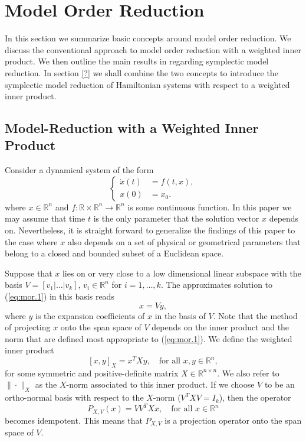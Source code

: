 \section{Model Order Reduction}
\label{sec:mor}

In this section we summarize basic concepts around model order reduction. We discuss the conventional approach to model order reduction with a weighted inner product. We then outline the main results in \cite{doi:10.1137/17M1111991} regarding symplectic model reduction. In section \ref{?} we shall combine the two concepts to introduce the symplectic model reduction of Hamiltonian systems with respect to a weighted inner product.

\subsection{Model-Reduction with a Weighted Inner Product} \label{sec:mor.1}
Consider a dynamical system of the form
\begin{equation} \label{eq:mor.1}
\left\{
\begin{aligned}
	\dot x(t) &= f(t,x), \\
	x(0) &= x_0.
\end{aligned}
\right.
\end{equation}
where $x\in \mathbb R^{n}$ and $f:\mathbb R \times \mathbb R^{n} \to \mathbb R^{n}$ is some continuous function. In this paper we may assume that time $t$ is the only parameter that the solution vector $x$ depends on. Nevertheless, it is straight forward to generalize the findings of this paper to the case where $x$ also depends on a set of physical or geometrical parameters that belong to a closed and bounded subset of a Euclidean space.

Suppose that $x$ lies on or very close to a low dimensional linear subspace with the basis $V=[v_1|\dots|v_k]$, $v_i\in \mathbb R^{n}$ for $i=1,\dots,k$. The approximates solution to (\ref{eq:mor.1}) in this basis reads
\begin{equation} \label{eq:mor.2}
	x = Vy,
\end{equation}
where $y$ is the expansion coefficients of $x$ in the basis of $V$. Note that the method of projecting $x$ onto the span space of $V$ depends on the inner product and the norm that are defined most appropriate to (\ref{eq:mor.1}). We define the weighted inner product
\begin{equation} \label{eq:mor.3}
	[x,y]_X = x^TXy,\quad \text{for all } x,y \in \mathbb R^n,
\end{equation}
for some symmetric and positive-definite matrix $X\in \mathbb{R}^{n\times n}$. We also refer to $\|\cdot \|_X$ as the $X$-norm associated to this inner product. If we choose $V$ to be an ortho-normal basis with respect to the $X$-norm ($V^TXV=I_k$), then the operator
\begin{equation} \label{eq:mor.4}
	P_{X,V}(x) = VV^TXx, \quad \text{for all } x\in \mathbb R^{n}
\end{equation}
becomes idempotent. This means that $P_{X,V}$ is a projection operator onto the span space of $V$.

